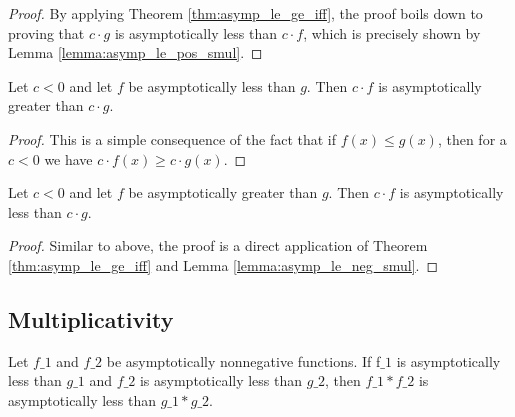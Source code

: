 \begin{proof}
    \leanok
    By applying Theorem \ref{thm:asymp_le_ge_iff}, the proof boils down to proving that
    $c \cdot g$ is asymptotically less than $c \cdot f$, which is precisely shown
    by Lemma \ref{lemma:asymp_le_pos_smul}.
\end{proof}

\begin{lemma}
    \label{lemma:asymp_le_neg_smul}
    \leanok
    Let $c < 0$ and let $f$ be asymptotically less than $g$. Then $c \cdot f$ is asymptotically
    greater than $c \cdot g$.
\end{lemma}

\begin{proof}
    \leanok
    This is a simple consequence of the fact that if $f(x) \le g(x)$, then for a $c < 0$
    we have $c \cdot f(x) \ge c \cdot g(x)$.
\end{proof}

\begin{lemma}
    \label{lemma:asymp_ge_neg_smul}
    \leanok
    Let $c < 0$ and let $f$ be asymptotically greater than $g$. Then $c \cdot f$ is asymptotically
    less than $c \cdot g$.
\end{lemma}

\begin{proof}
    \leanok
    Similar to above, the proof is a direct application of Theorem \ref{thm:asymp_le_ge_iff}
    and Lemma \ref{lemma:asymp_le_neg_smul}.
\end{proof}


\subsection{Multiplicativity}

\begin{theorem}
    \label{thm:asymp_le_nonneg_mul}
    \leanok
    Let $f\_1$ and $f\_2$ be asymptotically nonnegative functions. If f$\_1$ is asymptotically
    less than $g\_1$ and $f\_2$ is asymptotically less than $g\_2$, then $f\_1 * f\_2$
    is asymptotically less than $g\_1 * g\_2$.
\end{theorem}

